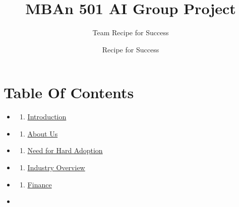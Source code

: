\documentclass[
]{article}
\title{MBAn 501 AI Group Project}
\subtitle{Team Recipe for Success}
\author{Recipe for Success}
\date{}
\providecommand{\tightlist}{%
  \setlength{\itemsep}{0pt}\setlength{\parskip}{0pt}}
\begin{document}
\maketitle

{
\setcounter{tocdepth}{2}
\tableofcontents
}
\hypertarget{table-of-contents}{%
\section*{Table Of Contents}\label{table-of-contents}}

\begin{itemize}
\item
  \begin{enumerate}
  \def\labelenumi{\arabic{enumi}.}
  \tightlist
  \item
    \href{https://tmittala.github.io/Recipe_for_Success/introduction.html}{Introduction}
  \end{enumerate}
\item
  \begin{enumerate}
  \def\labelenumi{\arabic{enumi}.}
  \setcounter{enumi}{1}
  \tightlist
  \item
    \href{https://tmittala.github.io/Recipe_for_Success/about-us.html}{About Us}
  \end{enumerate}
\item
  \begin{enumerate}
  \def\labelenumi{\arabic{enumi}.}
  \setcounter{enumi}{2}
  \tightlist
  \item
    \href{https://tmittala.github.io/Recipe_for_Success/need-for-hard-adoption.html}{Need for Hard Adoption}
  \end{enumerate}
\item
  \begin{enumerate}
  \def\labelenumi{\arabic{enumi}.}
  \setcounter{enumi}{3}
  \tightlist
  \item
    \href{https://tmittala.github.io/Recipe_for_Success/industry-overview.html}{Industry Overview}
  \end{enumerate}
\item
  \begin{enumerate}
  \def\labelenumi{\arabic{enumi}.}
  \setcounter{enumi}{4}
  \tightlist
  \item
    \href{https://tmittala.github.io/Recipe_for_Success/finance.html}{Finance}
  \end{enumerate}
\item
  \begin{enumerate}

\end{enumerate}
\end{itemize}
\end{document}
